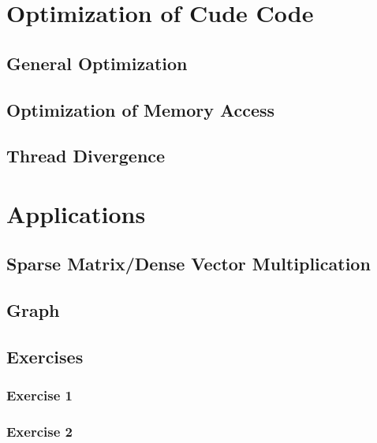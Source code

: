 \documentclass[12px,oz]{report}
\theoremstyle{indented}
\begin{document}
\chapter{Optimization of Cude Code}
\label{ch-opti-intro}


\section{General Optimization}
\label{sec-general-opti}


\section{Optimization of Memory Access}
\label{sec-opti-memory}


\section{Thread Divergence}
\label{sec-thread-div}


\chapter{Applications}
\label{ch-app}

	
	\section{Sparse Matrix/Dense Vector Multiplication}
	\label{sec-matrix}
	
	
	\section{Graph}
	\label{sec-graph}
	
	
	\section{Exercises}
	
		\subsection{Exercise 1}
		
		\subsection{Exercise 2}
		
\end{document}
